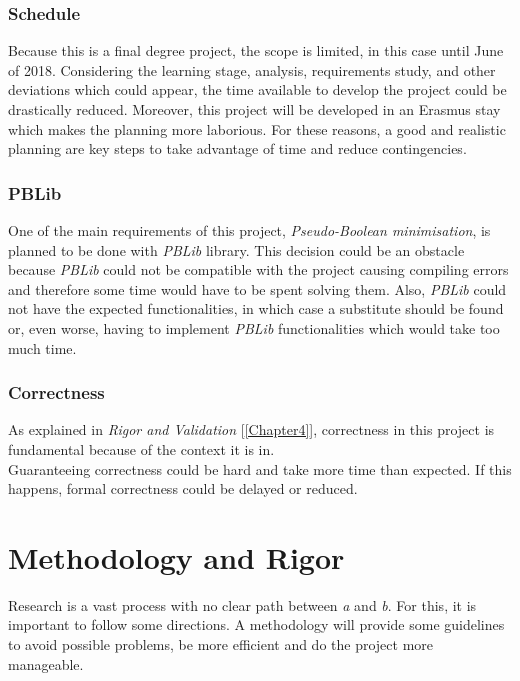 \subsubsection{Schedule}
Because this is a final degree project, the scope is limited, in this case until June of 2018. Considering the learning stage, analysis, requirements study, and other deviations which could appear, the time available to develop the project could be drastically reduced.  Moreover, this project will be developed in an Erasmus stay which makes the planning more laborious. 
For these reasons, a good and realistic planning are key steps to take advantage of time and reduce contingencies. 

\subsubsection{PBLib}
One of the main requirements of this project, \emph{Pseudo-Boolean minimisation}, is planned to be done with \emph{PBLib} library. This decision could be an obstacle because \emph{PBLib} could not be compatible with the project causing compiling errors and therefore some time would have to be spent solving them. Also, \emph{PBLib} could not have the expected functionalities, in which case a substitute should be found or, even worse, having to implement \emph{PBLib} functionalities which would take too much time. 

\subsubsection{Correctness}
As explained in \emph{Rigor and Validation} [\ref{Chapter4}], correctness in this project is fundamental because of the context it is in. \\
Guaranteeing correctness could be hard and take more time than expected. If this happens, formal correctness could be delayed or reduced. 

\section{Methodology and Rigor}
Research is a vast process with no clear path between \emph{a} and \emph{b}. For this, it is important to follow some directions. A methodology will provide some guidelines to avoid possible problems, be more efficient and do the project more manageable. 

